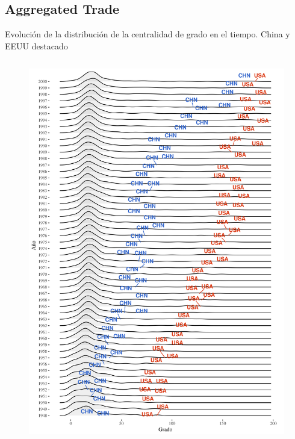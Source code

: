 \documentclass[compress]{beamer}
\begin{document}
\subsection{Aggregated Trade}
\begin{frame}	
\small{Evolución de la distribución de la centralidad de grado en el tiempo. China y EEUU destacado}

\begin{columns}[c] 


\begin{figure}
\includegraphics[scale=0.25]{1950_2000_impo_densidad_USA_CHN_grado}
\end{figure}



\end{columns}
\end{frame}
\end{document}
